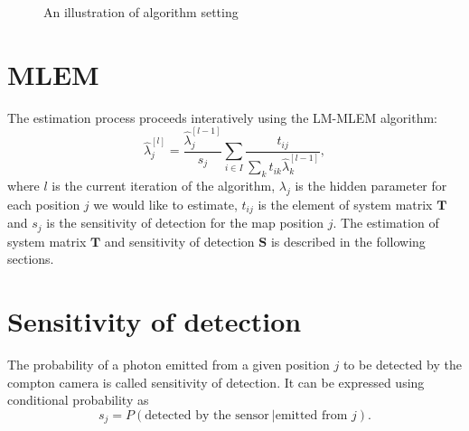 \begin{figure}[!h]
  \centering

  \caption{An illustration of algorithm setting}
  \label{fig:discretization}
\end{figure}

\section{MLEM}
The estimation process proceeds interatively using the \ac{LM-MLEM} algorithm:
\begin{equation}
  \hat{\lambda}_{j}^{[l]} = \frac{\hat{\lambda}_{j}^{[l-1]}}{s_{j}} \sum_{i \in I} \frac{t_{ij}}{\sum_{k} t_{ik} \hat{\lambda}_{k}^{[l-1]}},
  \label{eq:MLEM}
\end{equation}
where $l$ is the current iteration of the algorithm, $\lambda_{j}$ is the hidden parameter for each position $j$ we would like to estimate, $t_{ij}$ is the element of system matrix $\mathbf{T}$ and $s_{j}$ is the sensitivity of detection for the map position $j$.
The estimation of system matrix $\mathbf{T}$ and sensitivity of detection $\mathbf{S}$ is described in the following sections.


\section{Sensitivity of detection}
The probability of a photon emitted from a given position $j$ to be detected by the compton camera is called sensitivity of detection.
It can be expressed using conditional probability as 
\begin{equation}
  s_{j} =  P(\textrm{detected by the sensor}\ | \textrm{emitted from } j).
\end{equation}

